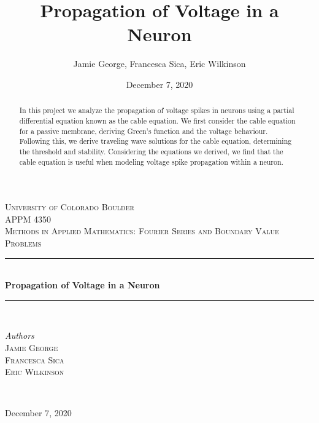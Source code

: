 \documentclass{article}
\title{
	
}
\author{\hmwkAuthorName}
\date{}
\title{Propagation of Voltage in a Neuron}
\author{Jamie George, Francesca Sica, Eric Wilkinson}
\date{December 7, 2020}
\begin{document}
\begin{titlepage} %
	\newcommand{\HRule}{\rule{\linewidth}{0.5mm}} %
	
	\center %
	
	
	\textsc{\LARGE University of Colorado Boulder}\\[1.5cm] %
	
	\textsc{\Large APPM 4350}\\[0.5cm] %
	
	\textsc{\large Methods in Applied Mathematics: Fourier Series and Boundary Value Problems}\\[0.5cm] %
	
	
	\HRule\\[0.4cm]
	
	{\huge\bfseries Propagation of Voltage in a Neuron}\\[0.4cm] %
	
	\HRule\\[1.5cm]
	
	
	\begin{minipage}{0.4\textwidth}
		\begin{flushleft}
			\large
			\textit{Authors}\\
			\textsc{Jamie George}\\
			\textsc{Francesca Sica}\\
			\textsc{Eric Wilkinson}\\
		\end{flushleft}
	\end{minipage}
~
	
	\vfill\vfill\vfill 
	
	{\large December 7, 2020} 
	
	\vfill %
	
\end{titlepage}


\pagebreak

\begin{abstract}
In this project we analyze the propagation of voltage spikes in neurons using a partial differential equation known as the cable equation. We first consider the cable equation for a passive membrane, deriving Green's function and the voltage behaviour. Following this, we derive traveling wave solutions for the cable equation, determining the threshold and stability. Considering the equations we derived, we find that the cable equation is useful when modeling voltage spike propagation within a neuron.
\end{abstract}
\end{document}
